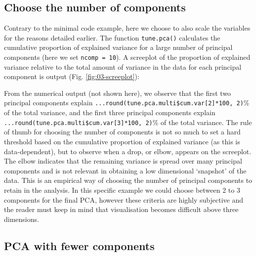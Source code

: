 \documentclass[
]{book}
\newenvironment{Shaded}{\begin{snugshade}}{\end{snugshade}}
\newcommand{\AttributeTok}[1]{\textcolor[rgb]{0.77,0.63,0.00}{#1}}
\newcommand{\CommentTok}[1]{\textcolor[rgb]{0.56,0.35,0.01}{\textit{#1}}}
\newcommand{\ConstantTok}[1]{\textcolor[rgb]{0.00,0.00,0.00}{#1}}
\newcommand{\DecValTok}[1]{\textcolor[rgb]{0.00,0.00,0.81}{#1}}
\newcommand{\FunctionTok}[1]{\textcolor[rgb]{0.00,0.00,0.00}{#1}}
\newcommand{\NormalTok}[1]{#1}
\newcommand{\OtherTok}[1]{\textcolor[rgb]{0.56,0.35,0.01}{#1}}
\begin{document}
\hypertarget{03:pca-ncomp}{%
\subsection{Choose the number of components}\label{03:pca-ncomp}}

Contrary to the minimal code example, here we choose to also scale the variables for the reasons detailed earlier. The function \texttt{tune.pca()} calculates the cumulative proportion of explained variance for a large number of principal components (here we set \texttt{ncomp\ =\ 10}). A screeplot of the proportion of explained variance relative to the total amount of variance in the data for each principal component is output (Fig. \ref{fig:03-screeplot}):

\begin{Shaded}
\end{Shaded}



From the numerical output (not shown here), we observe that the first two principal components explain \texttt{...round(tune.pca.multi\$cum.var{[}2{]}*100,\ 2)}\% of the total variance, and the first three principal components explain \texttt{...round(tune.pca.multi\$cum.var{[}3{]}*100,\ 2)}\% of the total variance. The rule of thumb for choosing the number of components is not so much to set a hard threshold based on the cumulative proportion of explained variance (as this is data-dependent), but to observe when a drop, or elbow, appears on the screeplot. The elbow indicates that the remaining variance is spread over many principal components and is not relevant in obtaining a low dimensional `snapshot' of the data. This is an empirical way of choosing the number of principal components to retain in the analysis. In this specific example we could choose between 2 to 3 components for the final PCA, however these criteria are highly subjective and the reader must keep in mind that visualisation becomes difficult above three dimensions.

\hypertarget{03:pca-final}{%
\subsection{PCA with fewer components}\label{03:pca-final}}
\end{document}
